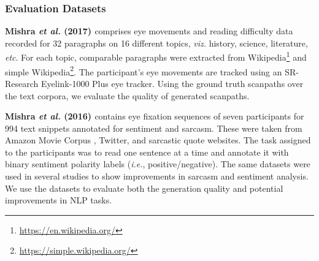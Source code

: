 \subsubsection{Evaluation Datasets}
\label{sec:eval_datasets}
\textbf{Mishra \textit{et al.} (2017) \cite{Mishra_Kanojia_Nagar_Dey_Bhattacharyya_2017}} comprises eye movements and reading difficulty data recorded for 32 paragraphs on 16 different topics, \textit{viz.} history, science, literature, \textit{etc}. For each topic, comparable paragraphs were extracted from Wikipedia\footnote{\url{https://en.wikipedia.org/}} and simple Wikipedia\footnote{\url{https://simple.wikipedia.org/}}. The participant's eye movements are tracked using an SR-Research Eyelink-1000 Plus eye tracker. Using the ground truth scanpaths over the text corpora, we evaluate the quality of generated scanpaths.


\textbf{Mishra \textit{et al.} (2016) \cite{mishra2016predicting}} contains eye fixation sequences of seven participants for 994 text snippets annotated for sentiment and sarcasm. These were taken from Amazon Movie Corpus %
, Twitter, and sarcastic quote websites. %
The task assigned to the participants was to read one sentence at a time and annotate it with binary sentiment polarity labels (\textit{i.e.}, positive/negative). %
The same datasets were used in several studies \cite{joshi-etal-2015-harnessing,mishra-etal-2016-harnessing,mishra-etal-2016-leveraging} to show improvements in sarcasm and sentiment analysis.
We use the datasets to evaluate both the generation quality and potential improvements in NLP tasks.%


